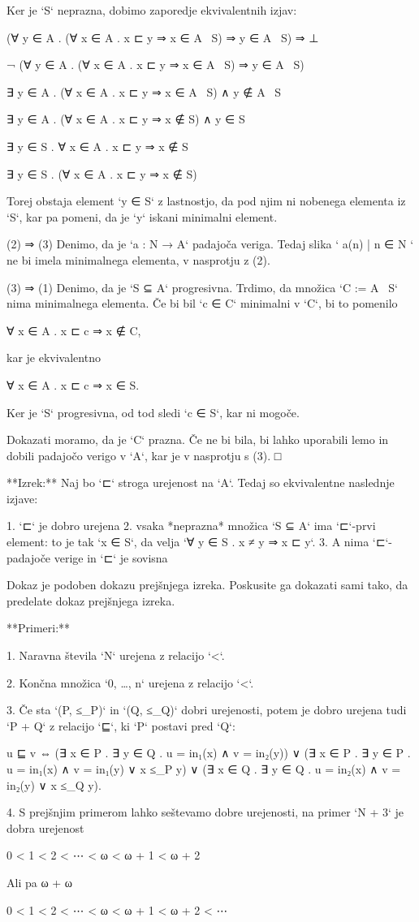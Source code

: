 Ker je `S` neprazna, dobimo zaporedje ekvivalentnih izjav:

     (∀ y ∈ A . (∀ x ∈ A . x ⊏ y ⇒ x ∈ A \ S) ⇒ y ∈ A \ S) ⇒ ⊥

     ¬ (∀ y ∈ A . (∀ x ∈ A . x ⊏ y ⇒ x ∈ A \ S) ⇒ y ∈ A \ S)

     ∃ y ∈ A . (∀ x ∈ A . x ⊏ y ⇒ x ∈ A \ S) ∧ y ∉ A \ S

     ∃ y ∈ A . (∀ x ∈ A . x ⊏ y ⇒ x ∉ S) ∧ y ∈ S

     ∃ y ∈ S . ∀ x ∈ A . x ⊏ y ⇒ x ∉ S

     ∃ y ∈ S . (∀ x ∈ A . x ⊏ y ⇒ x ∉ S)

Torej obstaja element `y ∈ S` z lastnostjo, da pod njim ni nobenega elementa iz
`S`, kar pa pomeni, da je `y` iskani minimalni element.

(2) ⇒ (3) Denimo, da je `a : N → A` padajoča veriga. Tedaj slika `{ a(n) | n ∈ N }` ne bi imela
minimalnega elementa, v nasprotju z (2).

(3) ⇒ (1) Denimo, da je `S ⊆ A` progresivna. Trdimo, da množica `C := A \ S` nima
minimalnega elementa. Če bi bil `c ∈ C` minimalni v `C`, bi to pomenilo

    ∀ x ∈ A . x ⊏ c ⇒ x ∉ C,

kar je ekvivalentno

    ∀ x ∈ A . x ⊏ c ⇒ x ∈ S.

Ker je `S` progresivna, od tod sledi `c ∈ S`, kar ni mogoče.

Dokazati moramo, da je `C` prazna. Če ne bi bila, bi lahko uporabili lemo in dobili padajočo
verigo v `A`, kar je v nasprotju s (3). □

**Izrek:** Naj bo `⊏` stroga urejenost na `A`. Tedaj so ekvivalentne naslednje izjave:

1. `⊏` je dobro urejena
2. vsaka *neprazna* množica `S ⊆ A` ima `⊏`-prvi element: to je tak `x ∈ S`, da velja
   `∀ y ∈ S . x ≠ y ⇒ x ⊏ y`.
3. A nima `⊏`-padajoče verige in `⊏` je sovisna

Dokaz je podoben dokazu prejšnjega izreka. Poskusite ga dokazati sami tako, da predelate
dokaz prejšnjega izreka.

**Primeri:**

1. Naravna števila `N` urejena z relacijo `<`.

2. Končna množica `{0, …, n}` urejena z relacijo `<`.

3. Če sta `(P, ≤_P)` in `(Q, ≤_Q)` dobri urejenosti, potem je dobro urejena tudi
   `P + Q` z relacijo `⊑`, ki `P` postavi pred `Q`:

        u ⊑ v ⇔
         (∃ x ∈ P . ∃ y ∈ Q . u = in₁(x) ∧ v = in₂(y)) ∨
         (∃ x ∈ P . ∃ y ∈ P . u = in₁(x) ∧ v = in₁(y) ∨ x ≤_P y) ∨
         (∃ x ∈ Q . ∃ y ∈ Q . u = in₂(x) ∧ v = in₂(y) ∨ x ≤_Q y).

4. S prejšnjim primerom lahko seštevamo dobre urejenosti, na primer `N + 3` je dobra
   urejenost

        0 < 1 < 2 < ⋯ < ω < ω + 1 < ω + 2

    Ali pa ω + ω

        0 < 1 < 2 < ⋯ < ω < ω + 1 < ω + 2 < ⋯
